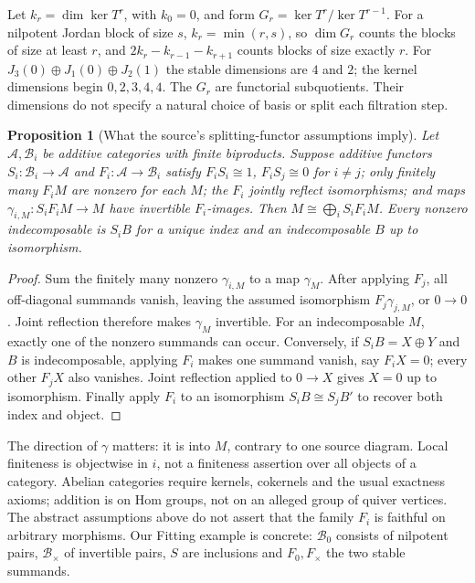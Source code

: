 \documentclass[11pt,oneside,openany]{book}
\newtheorem{proposition}[theorem]{Proposition}
\theoremstyle{definition}\newtheorem{definition}[theorem]{Definition}
\theoremstyle{remark}\newtheorem{remark}[theorem]{Remark}
\begin{document}
Let $k_r=\dim\ker T^r$, with $k_0=0$, and form
$G_r=\ker T^r/\ker T^{r-1}$. For a nilpotent Jordan block of size $s$,
$k_r=\min(r,s)$, so $\dim G_r$ counts the blocks of size at least $r$,
and $2k_r-k_{r-1}-k_{r+1}$ counts blocks of size exactly $r$.
For $J_3(0)\oplus J_1(0)\oplus J_2(1)$ the stable dimensions are
$4$ and $2$; the kernel dimensions begin $0,2,3,4,4$.
The $G_r$ are functorial subquotients. Their dimensions do not specify a
natural choice of basis or split each filtration step.

\begin{proposition}[What the source's splitting-functor assumptions imply]
Let $\mathcal A,\mathcal B_i$ be additive categories with finite
biproducts. Suppose additive functors $S_i:\mathcal B_i\to\mathcal A$
and $F_i:\mathcal A\to\mathcal B_i$ satisfy
$F_iS_i\cong1$, $F_iS_j\cong0$ for $i\ne j$; only finitely many
$F_iM$ are nonzero for each $M$; the $F_i$ jointly reflect isomorphisms;
and maps $\gamma_{i,M}:S_iF_iM\to M$ have invertible $F_i$-images.
Then $M\cong\bigoplus_i S_iF_iM$. Every nonzero indecomposable is
$S_iB$ for a unique index and an indecomposable $B$ up to isomorphism.
\end{proposition}
\begin{proof}
Sum the finitely many nonzero $\gamma_{i,M}$ to a map $\gamma_M$.
After applying $F_j$, all off-diagonal summands vanish, leaving the
assumed isomorphism $F_j\gamma_{j,M}$, or $0\to0$. Joint reflection
therefore makes $\gamma_M$ invertible. For an indecomposable $M$, exactly
one of the nonzero summands can occur. Conversely, if $S_iB=X\oplus Y$
and $B$ is indecomposable, applying $F_i$ makes one summand vanish, say
$F_iX=0$; every other $F_jX$ also vanishes. Joint reflection applied to
$0\to X$ gives $X=0$ up to isomorphism. Finally apply $F_i$ to an
isomorphism $S_iB\cong S_jB'$ to recover both index and object.
\end{proof}
The direction of $\gamma$ matters: it is into $M$, contrary to one source
diagram. Local finiteness is objectwise in $i$, not a finiteness assertion
over all objects of a category. Abelian categories require kernels,
cokernels and the usual exactness axioms; addition is on Hom groups, not
on an alleged group of quiver vertices. The abstract assumptions above
do not assert that the family $F_i$ is faithful on arbitrary morphisms.
Our Fitting example is concrete: $\mathcal B_0$ consists of nilpotent
pairs, $\mathcal B_\times$ of invertible pairs, $S$ are inclusions and
$F_0,F_\times$ the two stable summands.
\end{document}
